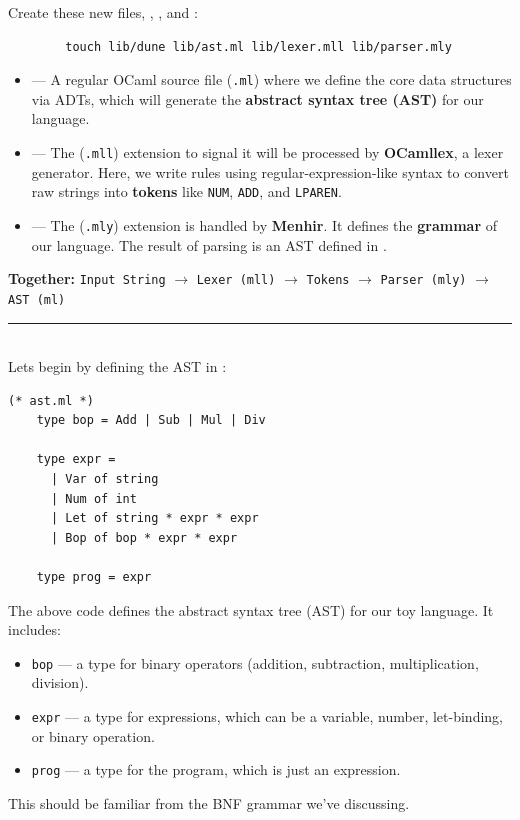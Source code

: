 \newpage 

\begin{Example}

    \noindent
    Create these new files, , , and :
    \begin{lstlisting}
        touch lib/dune lib/ast.ml lib/lexer.mll lib/parser.mly
    \end{lstlisting}

\begin{itemize}
    \item {} — A regular OCaml source file (\texttt{.ml}) where we define the core data structures via ADTs, which will generate the \textbf{abstract syntax tree (AST)} for our language.

    \item {} — The (\texttt{.mll}) extension to signal it will be processed by \textbf{OCamllex}, a lexer generator. Here, we write rules using regular-expression-like syntax to convert raw strings into \textbf{tokens} like \texttt{NUM}, \texttt{ADD}, and \texttt{LPAREN}.

    \item {} — The (\texttt{.mly}) extension is handled by \textbf{Menhir}. It defines the \textbf{grammar} of our language. The result of parsing is an AST defined in .
\end{itemize}

\noindent
\textbf{Together:} 
\texttt{Input String} $\rightarrow$ \texttt{Lexer (mll)} $\rightarrow$ \texttt{Tokens} $\rightarrow$ \texttt{Parser (mly)} $\rightarrow$ \texttt{AST (ml)}

\noindent
\rule{\textwidth}{0.4pt}\\

\noindent
Lets begin by defining the AST in :
\begin{lstlisting}[numbers=none]
    (* ast.ml *)
    type bop = Add | Sub | Mul | Div 
    
    type expr =
      | Var of string
      | Num of int
      | Let of string * expr * expr
      | Bop of bop * expr * expr
    
    type prog = expr
    \end{lstlisting}

\noindent
    The above code defines the abstract syntax tree (AST) for our toy language. It includes:
    \begin{itemize}
        \item \texttt{bop} — a type for binary operators (addition, subtraction, multiplication, division).
        \item \texttt{expr} — a type for expressions, which can be a variable, number, let-binding, or binary operation.
        \item \texttt{prog} — a type for the program, which is just an expression.
    \end{itemize}

    \noindent
    This should be familiar from the BNF grammar we've discussing.
\end{Example}

